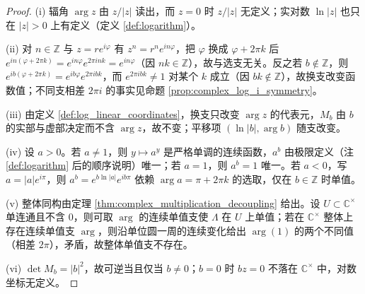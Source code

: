 \begin{proof}
(i) 辐角 $\arg z$ 由 $z/|z|$ 读出，而 $z=0$ 时 $z/|z|$ 无定义；实对数 $\ln|z|$ 也只在 $|z|>0$ 上有定义（定义 \ref{def:logarithm}）。

(ii) 对 $n\in\mathbb{Z}$ 与 $z=re^{i\varphi}$ 有 $z^n=r^ne^{in\varphi}$，把 $\varphi$ 换成 $\varphi+2\pi k$ 后 $e^{in(\varphi+2\pi k)}=e^{in\varphi}e^{2\pi ink}=e^{in\varphi}$（因 $nk\in\mathbb{Z}$），故与选支无关。反之若 $b\notin\mathbb{Z}$，则 $e^{ib(\varphi+2\pi k)}=e^{ib\varphi}e^{2\pi ibk}$，而 $e^{2\pi ibk}\neq1$ 对某个 $k$ 成立（因 $bk\notin\mathbb{Z}$），故换支改变函数值；不同支相差 $2\pi i$ 的事实见命题 \ref{prop:complex_log_i_symmetry}。

(iii) 由定义 \ref{def:log_linear_coordinates}，换支只改变 $\arg z$ 的代表元，$M_b$ 由 $b$ 的实部与虚部决定而不含 $\arg z$，故不变；平移项 $(\ln|b|,\arg b)$ 随支改变。

(iv) 设 $a>0$。若 $a\neq1$，则 $y\mapsto a^y$ 是严格单调的连续函数，$a^b$ 由极限定义（注 \ref{def:logarithm} 后的顺序说明）唯一；若 $a=1$，则 $a^b=1$ 唯一。若 $a<0$，写 $a=|a|e^{i\pi}$，则 $a^b=e^{b\ln|a|}e^{ib\pi}$ 依赖 $\arg a=\pi+2\pi k$ 的选取，仅在 $b\in\mathbb{Z}$ 时单值。

(v) 整体同构由定理 \ref{thm:complex_multiplication_decoupling} 给出。设 $U\subset\mathbb{C}^{\times}$ 单连通且不含 $0$，则可取 $\arg$ 的连续单值支使 $\Lambda$ 在 $U$ 上单值；若在 $\mathbb{C}^{\times}$ 整体上存在连续单值支 $\arg$，则沿单位圆一周的连续变化给出 $\arg(1)$ 的两个不同值（相差 $2\pi$），矛盾，故整体单值支不存在。

(vi) $\det M_b=|b|^2$，故可逆当且仅当 $b\neq0$；$b=0$ 时 $bz=0$ 不落在 $\mathbb{C}^{\times}$ 中，对数坐标无定义。
\end{proof}

